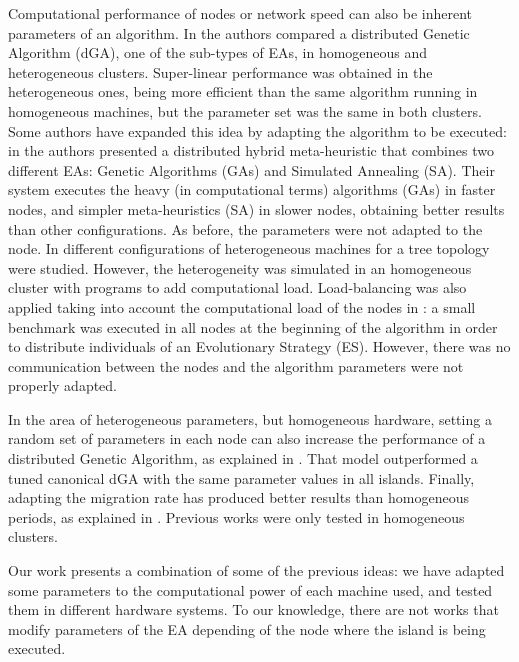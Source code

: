 \documentclass[final,1p,times]{elsarticle}
\begin{document}
 Computational performance of nodes or network speed can also be inherent parameters of an algorithm. In \cite{HETEROGENEOUSHARD} the authors compared a distributed Genetic Algorithm (dGA), one of the sub-types of EAs, in homogeneous and heterogeneous clusters. Super-linear performance was obtained in the heterogeneous ones, being more efficient than the same algorithm running in homogeneous machines, but the parameter set was the same in both clusters. Some authors have expanded this idea by adapting the algorithm to be executed: in \cite{HYDROCM} the authors presented a distributed hybrid meta-heuristic that combines two different EAs: Genetic Algorithms (GAs) and Simulated Annealing (SA). Their system executes the heavy (in computational terms) algorithms (GAs) in faster nodes, and simpler meta-heuristics (SA) in slower nodes, obtaining better results than other configurations. As before, the parameters were not adapted to the node. In \cite{HETEROGENEOUSTOPOLOGY} different configurations of heterogeneous machines for a tree topology were studied. However, the heterogeneity was simulated in an homogeneous cluster with programs to add computational load. Load-balancing was also applied taking into account the computational load of the nodes in \cite{PARALLELIMPLEMENTATION}: a small benchmark was executed in all nodes at the beginning of the algorithm in order to distribute individuals of an Evolutionary Strategy (ES). However, there was no communication between the nodes and the algorithm parameters were not properly adapted. 

In the area of heterogeneous parameters, but homogeneous hardware, setting a random set of parameters in each node can also increase the performance of a distributed Genetic Algorithm, as explained in \cite{HETEROGENEOUSPARAMETERS}. That model outperformed a tuned canonical dGA with the same parameter values in all islands. Finally, adapting the migration rate has produced better results than homogeneous periods, as explained in \cite{HETEROGENEOUSMIGRATION}. Previous works were only tested in homogeneous clusters.

 Our work presents a combination of some of the previous ideas: we have adapted some parameters to the computational power of each machine used, and tested them in different hardware systems.
 To our knowledge, there are not works that
 modify parameters of the EA depending of the
 node where the island is being executed. 
\end{document}
